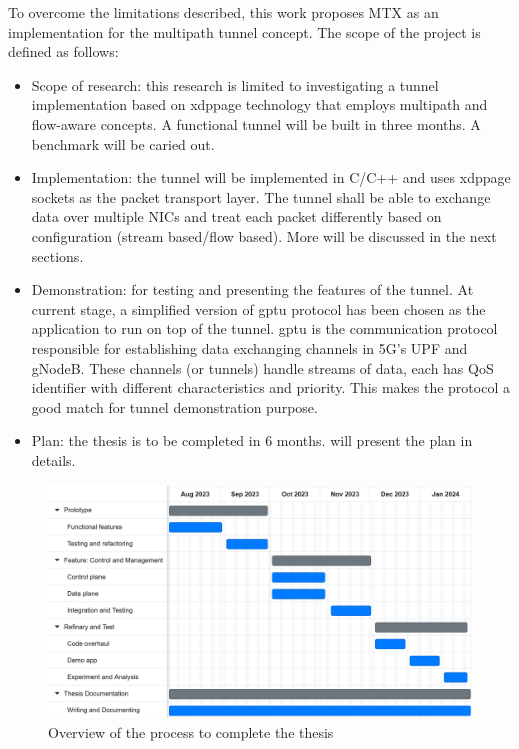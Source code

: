 To overcome the limitations described, this work proposes MTX as an implementation for the multipath tunnel concept.
The scope of the project is defined as follows:
\begin{itemize}
    \item Scope of research: this research is limited to investigating a tunnel implementation based on \ac{xdppage} technology that employs multipath and flow-aware concepts. 
    A functional tunnel will be built in three months.
    A benchmark will be caried out.
    \item Implementation: the tunnel will be implemented in C/C++ and uses \ac{xdppage} sockets as the packet transport layer. 
    The tunnel shall be able to exchange data over multiple \ac{NIC}s and treat each packet differently based on configuration (stream based/flow based). 
    More will be discussed in the next sections.
    \item Demonstration: for testing and presenting the features of the tunnel. 
    At current stage, a simplified version of \ac{gptu} protocol has been chosen as the application to run on top of the tunnel. 
    \ac{gptu} is the communication protocol responsible for establishing data exchanging channels in 5G's \ac{UPF} and gNodeB. 
    These channels (or tunnels) handle streams of data, each has \ac{QoS} identifier with different characteristics and priority. This makes the protocol a good match for tunnel demonstration purpose.
    \item Plan: the thesis is to be completed in 6 months.  will present the plan in details.
\end{itemize}

\begin{figure}[H]
	\centering
	\includegraphics[width=1.0\textwidth]{resources/images/mini_gannt.PNG}
	\caption{Overview of the process to complete the thesis}
    \label{fig:introduction:mini_gannt}
\end{figure}

